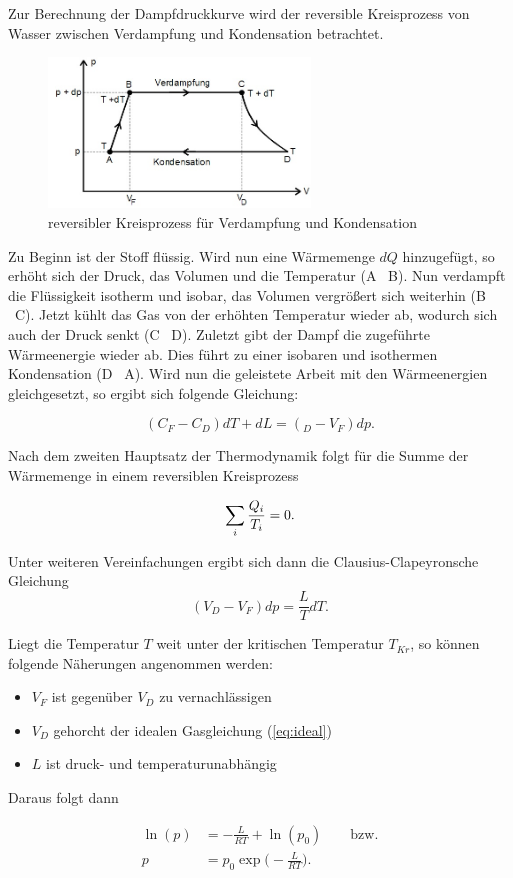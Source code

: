 Zur Berechnung der Dampfdruckkurve wird der reversible Kreisprozess von Wasser
zwischen Verdampfung und Kondensation betrachtet.

\begin{figure}[H]
  \centering
  \includegraphics[height=4cm]{Kreisprozess.jpeg}
  \caption{reversibler Kreisprozess für Verdampfung und Kondensation \cite{TU}}
  \label{fig:kreis}
\end{figure}

Zu Beginn ist der Stoff flüssig. Wird nun eine Wärmemenge $dQ$ hinzugefügt,
so erhöht sich der Druck, das Volumen und die Temperatur (A \rightarrow \ B).
Nun verdampft die Flüssigkeit isotherm und isobar, das Volumen
vergrößert sich weiterhin (B \rightarrow \ C). Jetzt kühlt das Gas von der erhöhten
Temperatur wieder ab, wodurch sich auch der Druck senkt (C \rightarrow \ D).
Zuletzt gibt der Dampf die zugeführte Wärmeenergie wieder ab. Dies führt zu einer
isobaren und isothermen Kondensation (D \rightarrow \ A).
Wird nun die geleistete Arbeit mit den Wärmeenergien gleichgesetzt, so ergibt sich
folgende Gleichung:

\begin{equation}
  (C_F - C_D)dT + dL = (_D - V_F)dp .
\end{equation}

Nach dem zweiten Hauptsatz der Thermodynamik folgt für die Summe der Wärmemenge
in einem reversiblen Kreisprozess

\begin{equation}
  \sum_i{\frac{Q_i}{T_i}} = 0 . \notag
\end{equation}

Unter weiteren Vereinfachungen ergibt sich dann die Clausius-Clapeyronsche
Gleichung
\begin{equation}
  (V_D - V_F)dp = \frac{L}{T}dT \label{eq:clausius}.
\end{equation}

Liegt die Temperatur $T$ weit unter der kritischen Temperatur $T_{Kr}$, so können
folgende Näherungen angenommen werden:
\begin{itemize}
  \item $V_F$ ist gegenüber $V_D$ zu vernachlässigen \\
  \item $V_D$ gehorcht der idealen Gasgleichung (\ref{eq:ideal}) \\
  \item $L$ ist druck- und temperaturunabhängig \\
\end{itemize}

Daraus folgt dann

\begin{align}
  \ln{(p)} &= -\frac{L}{RT} + \ln{(p_0)}  \qquad \text{bzw.} \label{eq:3}  \\
  p &= p_0 \exp{\biggr(-\frac{L}{RT} \biggl)} . \label{eq:4}
\end{align} \cite{TU}
